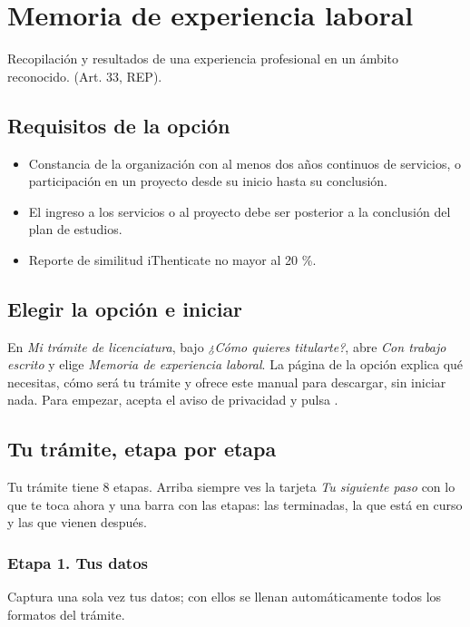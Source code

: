 \section{Memoria de experiencia laboral}
Recopilación y resultados de una experiencia profesional en un ámbito reconocido. (Art. 33, REP).

\subsection{Requisitos de la opción}
\begin{itemize}
  \item Constancia de la organización con al menos dos años continuos de servicios, o participación en un proyecto desde su inicio hasta su conclusión.
  \item El ingreso a los servicios o al proyecto debe ser posterior a la conclusión del plan de estudios.
  \item Reporte de similitud iThenticate no mayor al 20 \%.
\end{itemize}
\subsection{Elegir la opción e iniciar}
En \emph{Mi trámite de licenciatura}, bajo \emph{¿Cómo quieres titularte?}, abre \emph{Con trabajo escrito} y elige \emph{Memoria de experiencia laboral}. La página de la opción explica qué necesitas, cómo será tu trámite y ofrece este manual para descargar, sin iniciar nada. Para empezar, acepta el aviso de privacidad y pulsa .
\subsection{Tu trámite, etapa por etapa}
Tu trámite tiene 8 etapas. Arriba siempre ves la tarjeta \emph{Tu siguiente paso} con lo que te toca ahora y una barra con las etapas: las terminadas, la que está en curso y las que vienen después.
\subsubsection*{Etapa 1. Tus datos}
Captura una sola vez tus datos; con ellos se llenan automáticamente todos los formatos del trámite.

